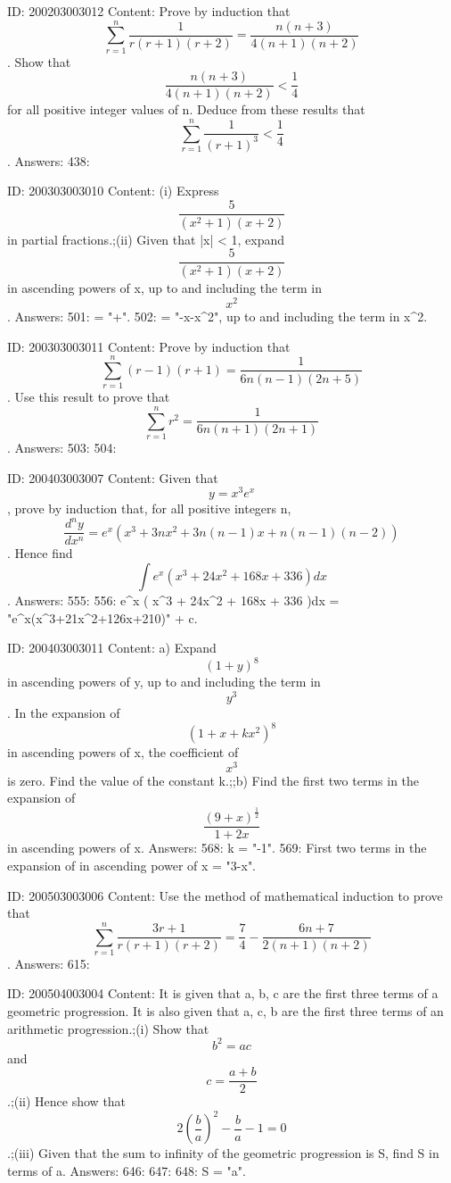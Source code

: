 \documentclass{article}
\begin{document}
ID: 200203003012
Content:
Prove by induction that  $$\sum_{r = 1}^{n} \frac{1}{r( r + 1 )( r + 2 )}  = \frac{n( n + 3 )}{4( n + 1 )( n + 2 )}$$. Show that  $$\frac{n( n + 3 )}{4( n + 1 )( n + 2 )} < \frac{1}{4}$$ for all positive integer values of n. Deduce from these results that  $$\sum_{r = 1}^{n} \frac{1}{( r + 1 )^3} < \frac{1}{4}$$. Answers:
438: 

ID: 200303003010
Content:
(i) Express  $$\frac{5}{( x^2  + 1 )( x + 2 )}$$ in partial fractions.;(ii) Given that |x| < 1, expand  $$\frac{5}{( x^2  + 1 )( x + 2 )}$$ in ascending powers of x, up to and including the term in  $$x^2 $$. Answers:
501:   = "+".
502:  = "-x-x^2", up to and including the term in x^2.

ID: 200303003011
Content:
Prove by induction that  $$\sum_{r = 1}^{n} ( r - 1 )( r + 1 ) = \frac{1}{6n( n - 1 )( 2n + 5 )}$$. Use this result to prove that  $$\sum_{r = 1}^{n} r^2  = \frac{1}{6n( n + 1 )( 2n + 1 )} $$. Answers:
503: 
504: 

ID: 200403003007
Content:
Given that  $$y = x^3 e^x $$, prove by induction that, for all positive integers n,  $$\frac{d^n y}{dx^n}= e^x ( x^3  + 3nx^2  + 3n( n - 1 )x + n( n - 1 )( n - 2 ) )$$. Hence find  $$\int e^x ( x^3  + 24x^2  + 168x + 336 )dx $$. Answers:
555: 
556: \int e^x ( x^3  + 24x^2  + 168x + 336 )dx  = "{{e}^{x}}({{x}^{3}}+21{{x}^{2}}+126x+210)" + c.

ID: 200403003011
Content:
a)  Expand  $$(1 + y)^8 $$ in ascending powers of y, up to and including the term in  $$y^3 $$. In the expansion of  $$( 1 + x + kx^2  )^8 $$ in ascending powers of x, the coefficient of  $$x^3 $$ is zero. Find the value of the constant k.;;b) Find the first two terms in the expansion of  $$\frac{(9 + x)^{\frac{1}{2}}}{1 + 2x}$$ in ascending powers of x. Answers:
568: k = "-1".
569: First two terms in the expansion of   in ascending power of x = "3-x".

ID: 200503003006
Content:
Use the method of mathematical induction to prove that $$\sum^n_{r = 1} \frac{3r + 1}{r( r + 1 ) ( r + 2 )} = \frac{7}{4} - \frac{6n + 7}{2( n + 1 ) ( n + 2 )}$$. Answers:
615: 

ID: 200504003004
Content:
It is given that a, b, c are the first three terms of a geometric progression. It is also given that a, c, b are the first three terms of an arithmetic progression.;(i) Show that  $$b^2  = ac$$ and  $$c = \frac{a +b}{2}$$.;(ii) Hence show that  $$2(\frac{b}{a})^2  -  \frac{b}{a} - 1 = 0$$.;(iii) Given that the sum to infinity of the geometric progression is S, find S in terms of a. Answers:
646: 
647: 
648: S = "a".
\end{document}

